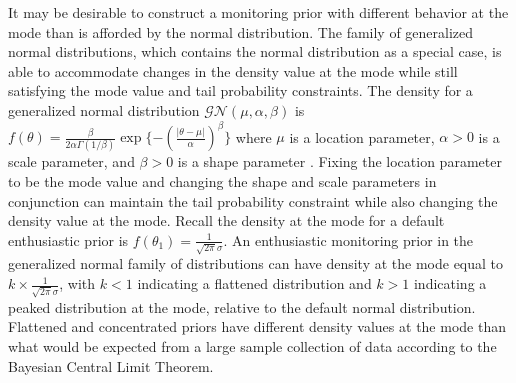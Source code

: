 \documentclass[useAMS,usenatbib,referee]{biom}
\begin{document}
It may be desirable to construct a monitoring prior with different behavior at the mode than is afforded by the normal distribution. 
%
%
The family of generalized normal distributions, which contains the normal distribution as a special case, is able to accommodate changes in the density value at the mode while still satisfying the mode value and tail probability constraints. 
%
The density for a generalized normal distribution $\mathcal{GN}(\mu,\alpha,\beta)$ is
$
f(\theta)=\frac{\beta}{2\alpha\Gamma(1/\beta)}\exp\{-(\frac{|\theta-\mu|}{\alpha})^\beta\}
$ where $\mu$ is a location parameter, $\alpha>0$ is a scale parameter, and $\beta>0$ is a shape parameter \citep{Nadarajah2005}. Fixing the location parameter to be the mode value and changing the shape and scale parameters in conjunction can maintain the tail probability constraint while also changing the density value at the mode. Recall the density at the mode for a default enthusiastic prior is $f(\theta_1)=\frac{1}{\sqrt{2\pi}\sigma}$. An enthusiastic monitoring prior in the generalized normal family of distributions can have density at the mode equal to $k\times \frac{1}{\sqrt{2\pi}\sigma}$, with $k<1$ indicating a flattened distribution and $k>1$ indicating a peaked distribution at the mode, relative to the default normal distribution. 
%
%
%
%
Flattened and concentrated priors have different density values at the mode than 
what would be expected from a large sample collection of data according to the Bayesian Central Limit Theorem.
\end{document}
